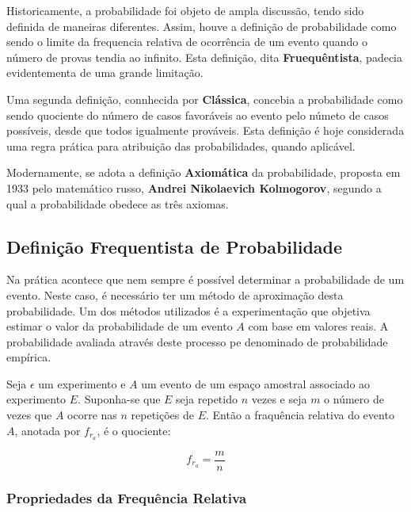 \inic Historicamente, a probabilidade foi objeto de ampla discussão, tendo sido definida de maneiras diferentes. Assim, houve a definição de probabilidade como sendo o limite da frequencia relativa de ocorrência de um evento quando o número de provas tendia ao infinito. Esta definição, dita \textbf{Fruequêntista}, padecia evidentementa de uma grande limitação.\vskip0.3cm
 
\inic Uma segunda definição, connhecida por \textbf{Clássica}, concebia a probabilidade como sendo quociente do número de casos favoráveis ao evento pelo númeto de casos possíveis, desde que todos igualmente prováveis. Esta definição é hoje considerada uma regra prática para atribuição das probabilidades, quando aplicável.\vskip0.3cm
 
 
\inic Modernamente, se adota a definição \textbf{Axiomática} da probabilidade, proposta em 1933 pelo matemático russo, \textbf{Andrei Nikolaevich Kolmogorov}, segundo a qual a probabilidade obedece as três axiomas.
 




 
\subsection{Definição Frequentista de Probabilidade}

\inic Na prática acontece que nem sempre é possível determinar a probabilidade de um evento. Neste caso, é necessário ter um método de aproximação desta probabilidade. Um dos métodos utilizados é a experimentação que objetiva estimar o valor da probabilidade de um evento $A$ com base em valores reais. A probabilidade avaliada através deste processo pe denominado de probabilidade empírica.\vskip0.3cm

\inic Seja $\epsilon$ um experimento e $A$ um evento de um espaço amostral associado ao experimento $E$. Suponha-se que $E$ seja repetido $n$ vezes e seja $m$ o número de vezes que $A$ ocorre nas $n$ repetições de $E$. Então a fraquência relativa do evento $A$, anotada por $f_{r_{a}}$, é o quociente:
 
\begin{equation}
     f_{r_{a}}= \frac{m}{n}
\end{equation}
 
 
\subsubsection{Propriedades da Frequência Relativa} 

